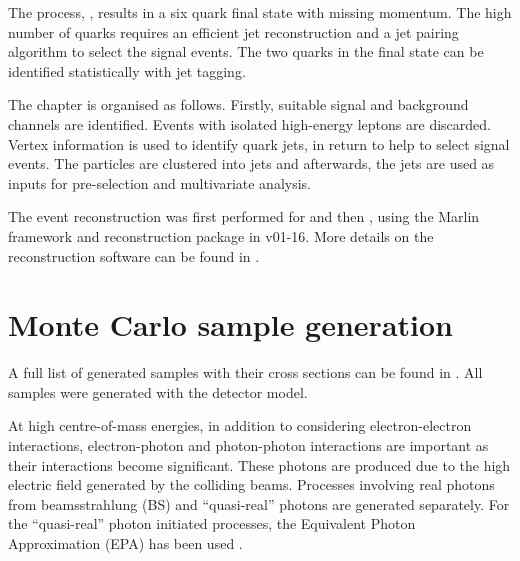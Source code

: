 
The process, \eeToHHbbWWHadFull, results in a six quark final state with missing momentum. The high number of quarks requires an efficient jet reconstruction and a jet pairing algorithm to select the signal events. The two \Pbottom quarks in the final state can be identified statistically with \Pbottom jet tagging. %

The chapter is organised as follows. Firstly, suitable signal and background channels are identified. Events with isolated high-energy leptons are discarded.  Vertex information is used to identify \Pbottom quark jets, in return to help to select signal events. The particles are clustered into jets and afterwards, the jets are used as inputs for pre-selection and multivariate analysis.

The event reconstruction was first performed for  and then , using the Marlin framework and reconstruction package in \ilcsoft v01-16. More details on the reconstruction software can be found in .







\section{Monte Carlo sample generation}

A full list of generated samples with their cross sections can be found in . All samples were generated with the \CLICILD detector model.

At high centre-of-mass energies, in addition to considering electron-electron interactions, electron-photon and photon-photon interactions are important as their interactions become significant. These photons are produced due to the high electric field generated by the colliding beams. Processes involving real photons from beamsstrahlung (BS) and ``quasi-real'' photons are generated separately. For the ``quasi-real'' photon initiated processes, the Equivalent Photon Approximation (EPA) has been used \cite{lyth:jpa00215525}.


